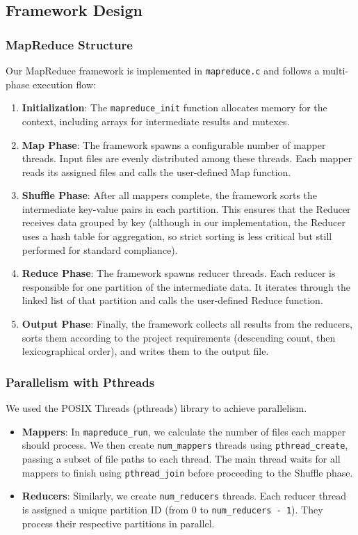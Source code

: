 \documentclass[a4paper,12pt]{article}
\begin{document}
\subsection{Framework Design}

\subsubsection{MapReduce Structure}
Our MapReduce framework is implemented in \texttt{mapreduce.c} and follows a multi-phase execution flow:
\begin{enumerate}
    \item \textbf{Initialization}: The \texttt{mapreduce\_init} function allocates memory for the context, including arrays for intermediate results and mutexes.
    \item \textbf{Map Phase}: The framework spawns a configurable number of mapper threads. Input files are evenly distributed among these threads. Each mapper reads its assigned files and calls the user-defined Map function.
    \item \textbf{Shuffle Phase}: After all mappers complete, the framework sorts the intermediate key-value pairs in each partition. This ensures that the Reducer receives data grouped by key (although in our implementation, the Reducer uses a hash table for aggregation, so strict sorting is less critical but still performed for standard compliance).
    \item \textbf{Reduce Phase}: The framework spawns reducer threads. Each reducer is responsible for one partition of the intermediate data. It iterates through the linked list of that partition and calls the user-defined Reduce function.
    \item \textbf{Output Phase}: Finally, the framework collects all results from the reducers, sorts them according to the project requirements (descending count, then lexicographical order), and writes them to the output file.
\end{enumerate}

\subsubsection{Parallelism with Pthreads}
We used the POSIX Threads (pthreads) library to achieve parallelism.
\begin{itemize}
    \item \textbf{Mappers}: In \texttt{mapreduce\_run}, we calculate the number of files each mapper should process. We then create \texttt{num\_mappers} threads using \texttt{pthread\_create}, passing a subset of file paths to each thread. The main thread waits for all mappers to finish using \texttt{pthread\_join} before proceeding to the Shuffle phase.
    \item \textbf{Reducers}: Similarly, we create \texttt{num\_reducers} threads. Each reducer thread is assigned a unique partition ID (from 0 to \texttt{num\_reducers - 1}). They process their respective partitions in parallel.
\end{itemize}
\end{document}
